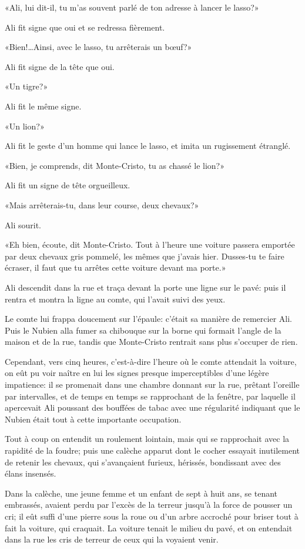 «Ali, lui dit-il, tu m'as souvent parlé de ton adresse à lancer le lasso?» 

Ali fit signe que oui et se redressa fièrement. 

«Bien!\dots Ainsi, avec le lasso, tu arrêterais un bœuf?» 

Ali fit signe de la tête que oui. 

«Un tigre?» 

Ali fit le même signe. 

«Un lion?» 

Ali fit le geste d'un homme qui lance le lasso, et imita un rugissement étranglé. 

«Bien, je comprends, dit Monte-Cristo, tu as chassé le lion?» 

Ali fit un signe de tête orgueilleux. 

«Mais arrêterais-tu, dans leur course, deux chevaux?» 

Ali sourit. 

«Eh bien, écoute, dit Monte-Cristo. Tout à l'heure une voiture passera emportée par deux chevaux gris pommelé, les mêmes que j'avais hier. Dusses-tu te faire écraser, il faut que tu arrêtes cette voiture devant ma porte.»  

Ali descendit dans la rue et traça devant la porte une ligne sur le pavé: puis il rentra et montra la ligne au comte, qui l'avait suivi des yeux. 

Le comte lui frappa doucement sur l'épaule: c'était sa manière de remercier Ali. Puis le Nubien alla fumer sa chibouque sur la borne qui formait l'angle de la maison et de la rue, tandis que Monte-Cristo rentrait sans plus s'occuper de rien. 

Cependant, vers cinq heures, c'est-à-dire l'heure où le comte attendait la voiture, on eût pu voir naître en lui les signes presque imperceptibles d'une légère impatience: il se promenait dans une chambre donnant sur la rue, prêtant l'oreille par intervalles, et de temps en temps se rapprochant de la fenêtre, par laquelle il apercevait Ali poussant des bouffées de tabac avec une régularité indiquant que le Nubien était tout à cette importante occupation. 

Tout à coup on entendit un roulement lointain, mais qui se rapprochait avec la rapidité de la foudre; puis une calèche apparut dont le cocher essayait inutilement de retenir les chevaux, qui s'avançaient furieux, hérissés, bondissant avec des élans insensés. 

Dans la calèche, une jeune femme et un enfant de sept à huit ans, se tenant embrassés, avaient perdu par l'excès de la terreur jusqu'à la force de pousser un cri; il eût suffi d'une pierre sous la roue ou d'un arbre accroché pour briser tout à fait la voiture, qui craquait. La voiture tenait le milieu du pavé, et on entendait dans la rue les cris de terreur de ceux qui la voyaient venir. 

